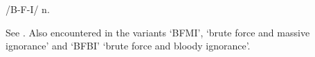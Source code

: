  /B-F-I/ n.

See . Also encountered in the variants
`BFMI', `brute force and massive ignorance' and `BFBI' `brute force and bloody
ignorance'.

